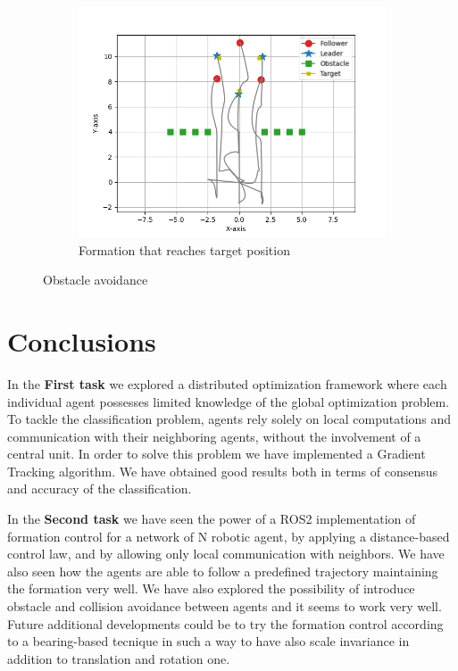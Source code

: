 \documentclass[a4paper,11pt,oneside]{book}
\begin{document}
\begin{figure}[h]
\begin{subfigure}{0.32\textwidth}
	\includegraphics[width=\textwidth]{Hexagon_obstacle_target.jpg}
	\caption{Formation that reaches target position}
	\end{subfigure}
\caption{Obstacle avoidance}
\label{obstacle}
\end{figure}




\chapter*{Conclusions}
In the \textbf{First task} we explored a distributed optimization framework where each individual agent possesses limited knowledge of the global optimization problem. To tackle the classification problem, agents rely solely on local computations and communication with their neighboring agents, without the involvement of a central unit. In order to solve this problem we have implemented a Gradient Tracking algorithm. 
We have obtained good results both in terms of consensus and accuracy of the classification. 

\bigskip
In the \textbf{Second task} we have seen the power of a ROS2 implementation of formation control for a network of N robotic agent, by applying a distance-based control law, and by allowing only local communication with neighbors. We have also seen how the agents are able to follow a predefined trajectory maintaining the formation very well.
We have also explored the possibility of introduce obstacle and collision avoidance between agents and it seems to work very well. Future additional developments could be to try the formation control according to a bearing-based tecnique in such a way to have also scale invariance in addition to translation and rotation one.


%


\end{document}
